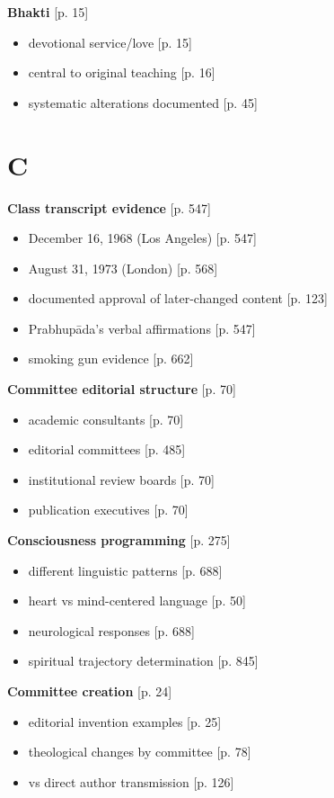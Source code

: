 \documentclass[11pt,twoside]{book}
\begin{document}
\textbf{\textbf{Bhakti}} {[}p. 15]
\begin{itemize}
\item devotional service/love [p. 15]
\item central to original teaching [p. 16]
\item systematic alterations documented [p. 45]
\end{itemize}
\section*{C}
\label{sec:orge6f366e}

\textbf{\textbf{Class transcript evidence}} {[}p. 547]
\begin{itemize}
\item December 16, 1968 (Los Angeles) [p. 547]
\item August 31, 1973 (London) [p. 568]
\item documented approval of later-changed content [p. 123]
\item Prabhupāda's verbal affirmations [p. 547]
\item smoking gun evidence [p. 662]
\end{itemize}

\textbf{\textbf{Committee editorial structure}} {[}p. 70]
\begin{itemize}
\item academic consultants [p. 70]
\item editorial committees [p. 485]
\item institutional review boards [p. 70]
\item publication executives [p. 70]
\end{itemize}

\textbf{\textbf{Consciousness programming}} {[}p. 275]
\begin{itemize}
\item different linguistic patterns [p. 688]
\item heart vs mind-centered language [p. 50]
\item neurological responses [p. 688]
\item spiritual trajectory determination [p. 845]
\end{itemize}

\textbf{\textbf{Committee creation}} {[}p. 24]
\begin{itemize}
\item editorial invention examples [p. 25]
\item theological changes by committee [p. 78]
\item vs direct author transmission [p. 126]
\end{itemize}
\end{document}
